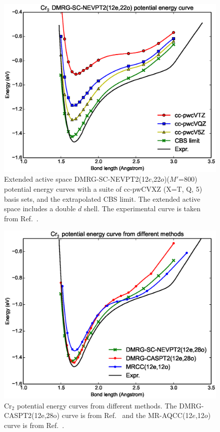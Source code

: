 \begin{figure}
  \centering
  \includegraphics[width=1.1\columnwidth]{Cr2-dmrg-nevpt2.eps}
  \caption{Extended active space DMRG-SC-NEVPT2(12$e$,22$o$)($M'$=800) potential energy curves with a suite of cc-pwCVXZ (X=T, Q, 5) basis sets,
    and the extrapolated CBS limit. The extended active space includes a double $d$ shell. 
The experimental curve is taken from Ref.~.}
  \label{fig:dmrg-nevpt2}
\end{figure}
\begin{figure}
  \includegraphics[width=1.5\columnwidth]{Cr2-curves.eps}
  \caption{Cr$_2$ potential energy curves from different methods.  The DMRG-CASPT2(12e,28o) curve is from Ref.~ and the MR-AQCC(12$e$,12$o$) curve is from Ref.~. }
  \label{fig:compare}
\end{figure}

